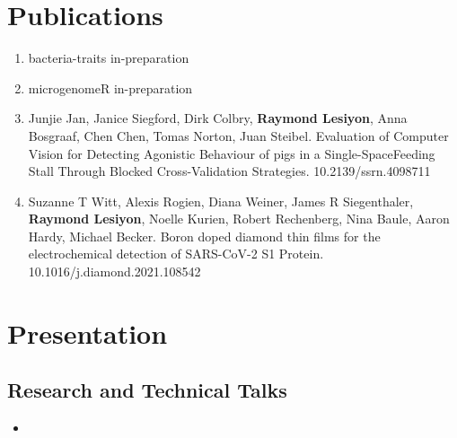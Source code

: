 \documentclass[12pt,a4paper,sans]{moderncv} %
\begin{document}
\section{Publications}

\begin{enumerate}
    \item bacteria-traits in-preparation
    \item microgenomeR in-preparation
    \item Junjie Jan, Janice Siegford, Dirk Colbry, \textbf{Raymond Lesiyon}, Anna Bosgraaf, Chen Chen, Tomas Norton, Juan Steibel. Evaluation of Computer Vision for Detecting Agonistic Behaviour of pigs in a Single-SpaceFeeding Stall Through Blocked Cross-Validation Strategies. 10.2139/ssrn.4098711
    \item Suzanne T Witt, Alexis Rogien, Diana Weiner, James R Siegenthaler, \textbf{Raymond Lesiyon}, Noelle Kurien, Robert Rechenberg, Nina Baule, Aaron Hardy, Michael Becker. Boron doped diamond thin films for the electrochemical detection of SARS-CoV-2 S1 Protein. 10.1016/j.diamond.2021.108542
\end{enumerate}


\section{Presentation}

\subsection{Research and Technical Talks} 
{
    \begin{itemize}
        \item { }
    \end{itemize}
}
\end{document}
